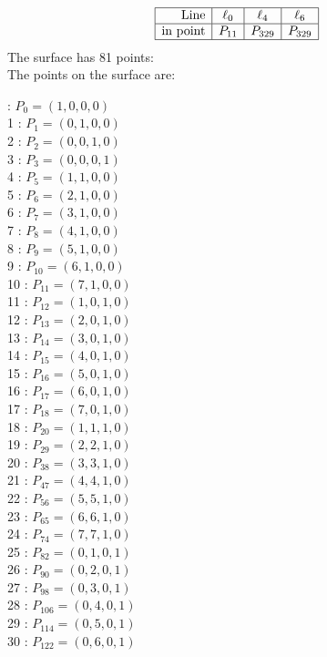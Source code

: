 \documentclass{article}
\begin{document}
{$$\begin{array}{|r*{3}{|c}|}
\hline
\mbox{Line}  & \ell_{0} & \ell_{4} & \ell_{6}\\
\hline
\mbox{in point}  & P_{11} & P_{329} & P_{329}\\
\hline
\end{array}
$$
The surface has 81 points:\\
The points on the surface are:\\
\begin{multicols}{3}
 : $P_{0}=( 1, 0, 0, 0 )$\\
1 : $P_{1}=( 0, 1, 0, 0 )$\\
2 : $P_{2}=( 0, 0, 1, 0 )$\\
3 : $P_{3}=( 0, 0, 0, 1 )$\\
4 : $P_{5}=( 1, 1, 0, 0 )$\\
5 : $P_{6}=( 2, 1, 0, 0 )$\\
6 : $P_{7}=( 3, 1, 0, 0 )$\\
7 : $P_{8}=( 4, 1, 0, 0 )$\\
8 : $P_{9}=( 5, 1, 0, 0 )$\\
9 : $P_{10}=( 6, 1, 0, 0 )$\\
10 : $P_{11}=( 7, 1, 0, 0 )$\\
11 : $P_{12}=( 1, 0, 1, 0 )$\\
12 : $P_{13}=( 2, 0, 1, 0 )$\\
13 : $P_{14}=( 3, 0, 1, 0 )$\\
14 : $P_{15}=( 4, 0, 1, 0 )$\\
15 : $P_{16}=( 5, 0, 1, 0 )$\\
16 : $P_{17}=( 6, 0, 1, 0 )$\\
17 : $P_{18}=( 7, 0, 1, 0 )$\\
18 : $P_{20}=( 1, 1, 1, 0 )$\\
19 : $P_{29}=( 2, 2, 1, 0 )$\\
20 : $P_{38}=( 3, 3, 1, 0 )$\\
21 : $P_{47}=( 4, 4, 1, 0 )$\\
22 : $P_{56}=( 5, 5, 1, 0 )$\\
23 : $P_{65}=( 6, 6, 1, 0 )$\\
24 : $P_{74}=( 7, 7, 1, 0 )$\\
25 : $P_{82}=( 0, 1, 0, 1 )$\\
26 : $P_{90}=( 0, 2, 0, 1 )$\\
27 : $P_{98}=( 0, 3, 0, 1 )$\\
28 : $P_{106}=( 0, 4, 0, 1 )$\\
29 : $P_{114}=( 0, 5, 0, 1 )$\\
30 : $P_{122}=( 0, 6, 0, 1 )$\\

\end{multicols}}
\end{document}
